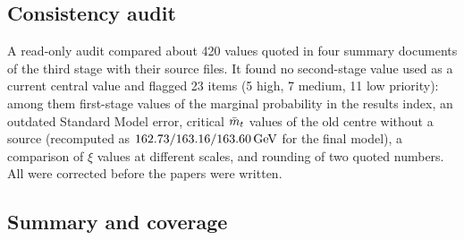 \subsection{Consistency audit}\label{sec:v19-audit}

A read-only audit compared about 420 values quoted in four summary documents of the third stage with their source files.
It found no second-stage value used as a current central value and flagged 23 items (5 high, 7 medium, 11 low priority): among them first-stage values of the marginal probability in the results index, an outdated Standard Model error, critical $\bar m_t$ values of the old centre without a source (recomputed as $162.73/\allowbreak 163.16/\allowbreak 163.60\,\mathrm{GeV}$ for the final model), a comparison of $\xi$ values at different scales, and rounding of two quoted numbers. %
All were corrected before the papers were written.

\subsection{Summary and coverage}\label{sec:v19-summary}

